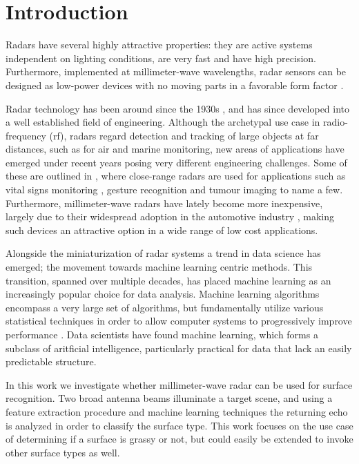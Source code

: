 \chapter{Introduction}


Radars have several highly attractive properties: they are active systems independent on lighting conditions, are very fast and have high precision. Furthermore, implemented at millimeter-wave wavelengths, radar sensors can be designed as low-power devices with no moving parts in a favorable form factor \citep{lien_gillian_karagozler_amihood_schwesig_olson_raja_poupyrev_2016}.

Radar technology has been around since the 1930s \citep{watson-watt_1945}, and has since developed into a well established field of engineering. Although the archetypal use case in radio-frequency (\gls{rf}), radars regard detection and tracking of large objects at far distances, such as for air and marine monitoring, new areas of applications have emerged under recent years posing very different engineering challenges. Some of these are outlined in \citep{amin_2017}, where close-range radars are used for applications such as vital signs monitoring \citep{kuo_lin_yu_lo_lyu_chou_chuang_2016}, gesture recognition \citep{lien_gillian_karagozler_amihood_schwesig_olson_raja_poupyrev_2016} and tumour imaging \citep{klemm_gibbins_leendertz_horseman_preece_benjamin_craddock_2011} to name a few. Furthermore, millimeter-wave radars have lately become more inexpensive, largely due to their widespread adoption in the automotive industry \citep{frenzel_2018}, making such devices an attractive option in a wide range of low cost applications.

Alongside the miniaturization of radar systems a trend in data science has emerged; the movement towards machine learning centric methods. This transition, spanned over multiple decades, has placed machine learning as an increasingly popular choice for data analysis. Machine learning algorithms encompass a very large set of algorithms, but fundamentally utilize various statistical techniques in order to allow computer systems to progressively improve performance \citep{a_smola_svn_vishwanathan_2010}. Data scientists have found machine learning, which forms a subclass of aritficial intelligence, particularly practical for data that lack an easily predictable structure.

In this work we investigate whether millimeter-wave radar can be used for surface recognition. Two broad antenna beams illuminate a target scene, and using a feature extraction procedure and machine learning techniques the returning echo is analyzed in order to classify the surface type. This work focuses on the use case of determining if a surface is grassy or not, but could easily be extended to invoke other surface types as well.  

